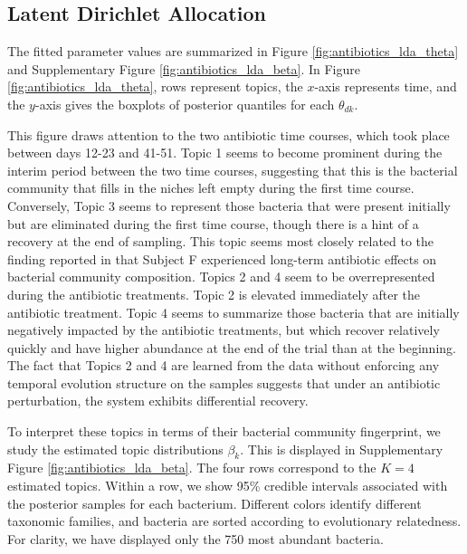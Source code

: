 \subsection{Latent Dirichlet Allocation}
\label{sec:antibiotics_lda}

The fitted parameter values are summarized in Figure
\ref{fig:antibiotics_lda_theta} and Supplementary Figure
\ref{fig:antibiotics_lda_beta}. In Figure \ref{fig:antibiotics_lda_theta}, rows
represent topics, the $x$-axis represents time, and the $y$-axis gives the
boxplots of posterior quantiles for each $\theta_{dk}$.

This figure draws attention to the two antibiotic time courses, which took place
between days 12-23 and 41-51. Topic 1 seems to become prominent during the
interim period between the two time courses, suggesting that this is the
bacterial community that fills in the niches left empty during the first time
course. Conversely, Topic 3 seems to represent those bacteria that were present
initially but are eliminated during the first time course, though there is a
hint of a recovery at the end of sampling. This topic seems most closely related
to the finding reported in \cite{dethlefsen2011incomplete} that Subject F
experienced long-term antibiotic effects on bacterial community composition.
Topics 2 and 4 seem to be overrepresented during the antibiotic treatments.
Topic 2 is elevated immediately after the antibiotic treatment. Topic 4 seems to
summarize those bacteria that are initially negatively impacted by the
antibiotic treatments, but which recover relatively quickly and have higher
abundance at the end of the trial than at the beginning. The fact that Topics 2
and 4 are learned from the data without enforcing any temporal evolution
structure on the samples suggests that under an antibiotic perturbation, the
system exhibits differential recovery.

To interpret these topics in terms of their bacterial community fingerprint, we
study the estimated topic distributions $\beta_{k}$. This is displayed in
Supplementary Figure \ref{fig:antibiotics_lda_beta}. The four rows correspond to
the $K = 4$ estimated topics. Within a row, we show 95\% credible intervals
associated with the posterior samples for each bacterium. Different colors
identify different taxonomic families, and bacteria are sorted according to
evolutionary relatedness. For clarity, we have displayed only the 750 most
abundant bacteria.

